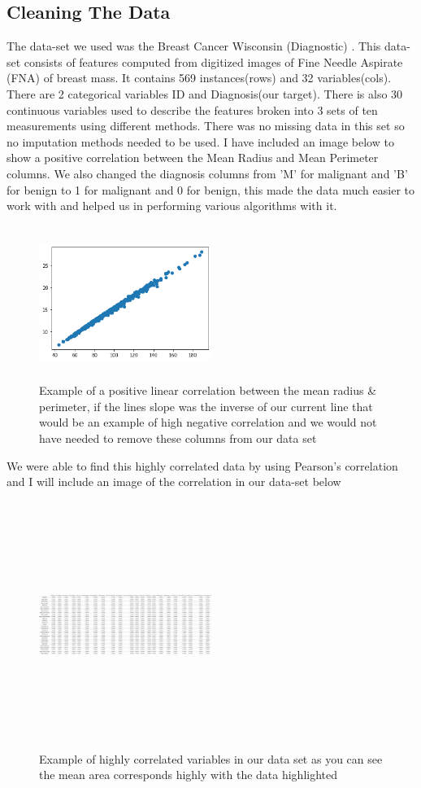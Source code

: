\documentclass[conference]{IEEEtran}
\begin{document}
\subsection{Cleaning The Data}
The data-set we used was the Breast Cancer Wisconsin (Diagnostic) \cite{misc_breast_cancer_wisconsin_17}. This data-set consists of features computed from digitized images of Fine Needle Aspirate (FNA) of breast mass. It contains 569 instances(rows) and 32 variables(cols). There are 2 categorical variables ID and Diagnosis(our target). There is also 30 continuous variables used to describe the features broken into 3 sets of ten measurements using different methods. There was no missing data in this set so no imputation methods needed to be used.
I have included an image below to show a positive correlation between the Mean Radius and Mean Perimeter columns.  We also changed the diagnosis columns from 'M' for malignant and 'B' for benign to 1 for malignant and 0 for benign, this made the data much easier to work with and helped us in performing various algorithms with it.
\begin{figure}[H] 
\caption{Example of a positive linear correlation between the mean radius \& perimeter, if the lines slope was the inverse of our current line that would be an example of high negative correlation and we would not have needed to remove these columns from our data set}
\centering
\includegraphics[height=50mm,width=0.5\textwidth]{positive_correlation.png}
\end{figure}
We were able to find this highly correlated data by using Pearson's correlation and I will include an image of the correlation in our data-set below
\begin{figure}[H]
\caption{Example of highly correlated variables in our data set as you can see the mean area corresponds highly with the data highlighted}
\centering
\includegraphics[height=80mm,width=0.5\textwidth]{dataset_correlation.PNG}
\end{figure}
\end{document}
